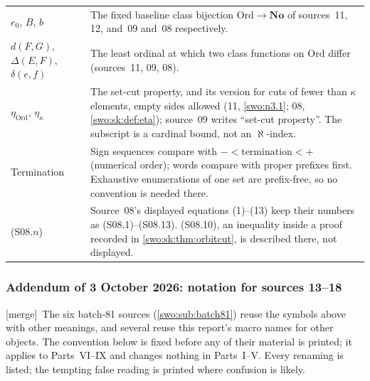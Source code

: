 \documentclass[11pt]{article}
\theoremstyle{definition}
\theoremstyle{remark}
\newcommand{\No}{\mathbf{No}}
\newcommand{\Ord}{\mathrm{Ord}}
\newcommand{\merge}{\textsf{[merge]}}
\begin{document}
\begin{longtable}{@{}>{\raggedright\arraybackslash}p{}>{\raggedright\arraybackslash}p{}@{}}
$e_0$, $B$, $b$ &
The fixed baseline class bijection $\Ord\to\No$ of sources~11, 12, and~09
and~08 respectively.\\[3pt]
$d(F,G)$, $\Delta(E,F)$, $\delta(e,f)$ &
The least ordinal at which two class functions on $\Ord$ differ (sources~11,
09, 08).\\[3pt]
$\eta_{\Ord}$, $\eta_\kappa$ &
The set-cut property, and its version for cuts of fewer than $\kappa$
elements, empty sides allowed (11, \cref{swo:n3.1}; 08,
\cref{swo:sk:def:eta}); source~09 writes ``set-cut property''. The
subscript is a cardinal bound, not an $\aleph$-index.\\[3pt]
Termination &
Sign sequences compare with $-<\text{termination}<+$ (numerical order);
words compare with proper prefixes first. Exhaustive enumerations of one set
are prefix-free, so no convention is needed there.\\[3pt]
(S08.$n$) &
Source~08's displayed equations (1)--(13) keep their numbers as
(S08.1)--(S08.13). (S08.10), an inequality inside a proof recorded in
\cref{swo:sk:thm:orbitcut}, is described there, not displayed.\\
\bottomrule
\end{longtable}
\endgroup

\subsubsection{Addendum of 3 October 2026: notation for sources 13--18}\label{swo:sub:notation81}

\merge\ The six batch-81 sources (\cref{swo:sub:batch81}) reuse the symbols
above with other meanings, and several reuse this report's macro names for
other objects. The convention below is fixed before any of their material is
printed; it applies to Parts~VI--IX and changes nothing in Parts~I--V. Every
renaming is listed; the tempting false reading is printed where confusion is
likely.
\end{document}
